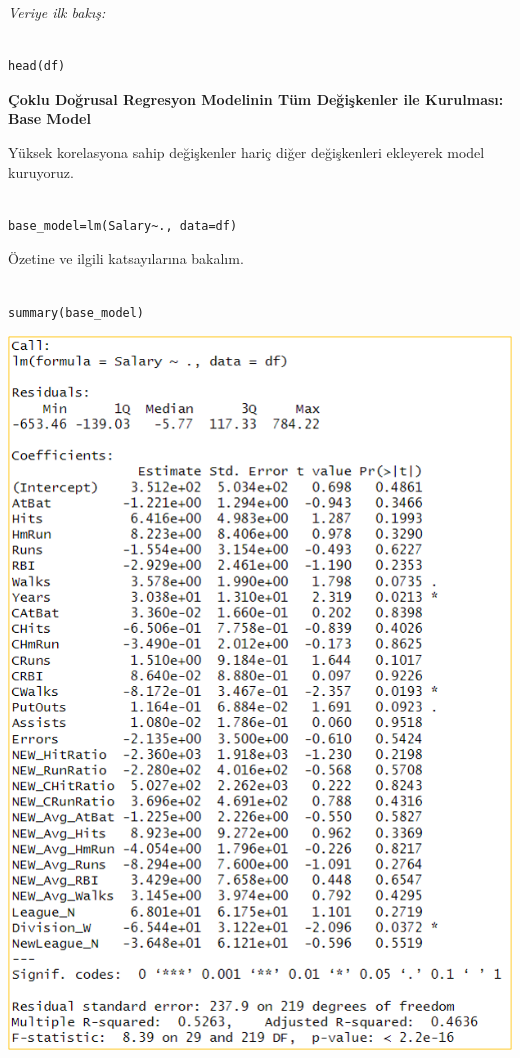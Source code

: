 \documentclass[
]{article}
\begin{document}
\emph{Veriye ilk bakış:}

\begin{verbatim}

head(df)
\end{verbatim}

\textbf{Çoklu Doğrusal Regresyon Modelinin Tüm Değişkenler ile
Kurulması: Base Model}

Yüksek korelasyona sahip değişkenler hariç diğer değişkenleri ekleyerek
model kuruyoruz.

\begin{verbatim}

base_model=lm(Salary~., data=df)
\end{verbatim}

Özetine ve ilgili katsayılarına bakalım.

\begin{verbatim}

summary(base_model)
\end{verbatim}

\includegraphics{Picture1.png}
\end{document}
